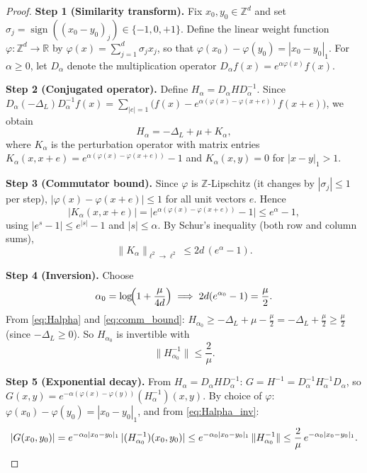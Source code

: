 \documentclass[11pt,a4paper]{amsart}
\theoremstyle{definition}
\newcommand{\Z}{\mathbb{Z}}
\newcommand{\R}{\mathbb{R}}
\begin{document}
\begin{proof}
\textbf{Step 1 (Similarity transform).}
Fix $x_0,y_0\in\Z^d$ and set $\sigma_j = \operatorname{sign}((x_0-y_0)_j)\in\{-1,0,+1\}$.
Define the linear weight function
$\varphi:\Z^d\to\R$ by $\varphi(x) = \sum_{j=1}^d \sigma_j x_j$,
so that $\varphi(x_0)-\varphi(y_0) = |x_0-y_0|_1$.
For $\alpha\ge 0$, let $D_\alpha$ denote the multiplication operator
$D_\alpha f(x) = e^{\alpha\varphi(x)} f(x)$.

\textbf{Step 2 (Conjugated operator).}
Define $H_\alpha = D_\alpha H D_\alpha^{-1}$.  Since
$D_\alpha(-\Delta_L)D_\alpha^{-1}f(x)
 = \sum_{|e|=1}\bigl(f(x) - e^{\alpha(\varphi(x)-\varphi(x+e))}f(x+e)\bigr)$,
we obtain
\begin{equation}
\label{eq:Halpha}
H_\alpha = -\Delta_L + \mu + K_\alpha,
\end{equation}
where $K_\alpha$ is the perturbation operator with matrix entries
$K_\alpha(x,x+e) = e^{\alpha(\varphi(x)-\varphi(x+e))} - 1$
and $K_\alpha(x,y)=0$ for $|x-y|_1>1$.

\textbf{Step 3 (Commutator bound).}
Since $\varphi$ is $\Z$-Lipschitz (it changes by $|\sigma_j|\le 1$ per step),
$|\varphi(x)-\varphi(x+e)|\le 1$ for all unit vectors $e$.
Hence
\[
  |K_\alpha(x,x+e)|
  = \bigl|e^{\alpha(\varphi(x)-\varphi(x+e))}-1\bigr|
  \le e^{\alpha}-1,
\]
using $|e^s-1|\le e^{|s|}-1$ and $|s|\le\alpha$.
By Schur's inequality (both row and column sums),
\begin{equation}
\label{eq:comm_bound}
  \|K_\alpha\|_{\ell^2\to\ell^2} \le 2d\,(e^\alpha-1).
\end{equation}

\textbf{Step 4 (Inversion).}
Choose
\begin{equation}
\label{eq:alpha_choice}
  \alpha_0 = \log\!\Bigl(1 + \frac{\mu}{4d}\Bigr)
  \;\Longrightarrow\;
  2d(e^{\alpha_0}-1) = \frac{\mu}{2}.
\end{equation}
From \eqref{eq:Halpha} and \eqref{eq:comm_bound}:
$H_{\alpha_0} \ge -\Delta_L + \mu - \tfrac{\mu}{2} = -\Delta_L + \tfrac{\mu}{2} \ge \tfrac{\mu}{2}$
(since $-\Delta_L\ge 0$).
So $H_{\alpha_0}$ is invertible with
\begin{equation}
\label{eq:Halpha_inv}
  \|H_{\alpha_0}^{-1}\| \le \frac{2}{\mu}.
\end{equation}

\textbf{Step 5 (Exponential decay).}
From $H_\alpha = D_\alpha H D_\alpha^{-1}$:
$G = H^{-1} = D_\alpha^{-1} H_\alpha^{-1} D_\alpha$, so
$G(x,y) = e^{-\alpha(\varphi(x)-\varphi(y))} (H_\alpha^{-1})(x,y)$.
By choice of $\varphi$: $\varphi(x_0)-\varphi(y_0) = |x_0-y_0|_1$, and
from \eqref{eq:Halpha_inv}:
\[
  |G(x_0,y_0)|
  = e^{-\alpha_0|x_0-y_0|_1}\,|(H_{\alpha_0}^{-1})(x_0,y_0)|
  \le e^{-\alpha_0|x_0-y_0|_1}\,\|H_{\alpha_0}^{-1}\|
  \le \frac{2}{\mu}\,e^{-\alpha_0|x_0-y_0|_1}. \qedhere
\]
\end{proof}
\end{document}
